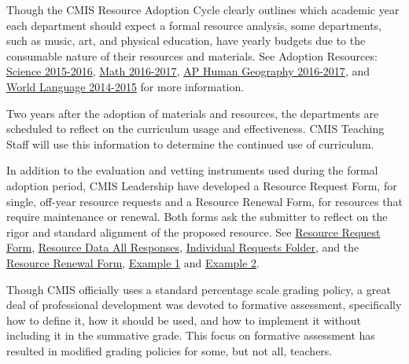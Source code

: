 \documentclass{report}
\begin{document}
\begin{findings}
Though the CMIS Resource Adoption Cycle clearly outlines which academic year each department should expect a formal resource analysis, some departments, such as music, art, and physical education, have yearly budgets due to the consumable nature of their resources and materials. See Adoption Resources: \href{https://drive.google.com/drive/folders/0ByVFfrm0zfoleXEyU3I0cTBXMVk?usp=sharing}{Science 2015-2016}, \href{https://drive.google.com/drive/folders/0ByVFfrm0zfolakRsUVNBaXhWcjQ?usp=sharing}{Math 2016-2017}, \href{https://drive.google.com/drive/folders/0ByVFfrm0zfolLUN5UThPTG5wQlE?usp=sharing}{AP Human Geography 2016-2017}, and \href{https://drive.google.com/drive/folders/0ByVFfrm0zfolfkhGeTFZSVRmSFNEZmhlaWZneEE5T0lwWjNQVnlFYVVWVlljU1RBTDZQc1k?usp=sharing}{World Language 2014-2015} for more information. 

Two years after the adoption of materials and resources, the departments are scheduled to reflect on the curriculum usage and effectiveness. CMIS Teaching Staff will use this information to determine the continued use of curriculum. 

In addition to the evaluation and vetting instruments used during the formal adoption period, CMIS Leadership have developed a Resource Request Form, for single, off-year resource requests and a Resource Renewal Form, for resources that require maintenance or renewal. Both forms ask the submitter to reflect on the rigor and standard alignment of the proposed resource. See \href{https://docs.google.com/a/cmis.ac.th/forms/d/1hBKsxgHpPSOT0MtUTsZBoVX2t3ztxeGVY4R4BVNeVL8/edit}{Resource Request Form}, \href{https://docs.google.com/a/cmis.ac.th/forms/d/1hBKsxgHpPSOT0MtUTsZBoVX2t3ztxeGVY4R4BVNeVL8/edit#responses}{Resource Data All Responses}, \href{https://drive.google.com/a/cmis.ac.th/folderview?id=0ByS3bptlVBHAejQ4NzU1N1N3czg&usp=sharing}{Individual Requests Folder}, and the \href{https://docs.google.com/a/cmis.ac.th/forms/d/1i6EnhitZ2yJZh-1OjL8jsJ2pFa7oRJCP0VcA50b_D6g/edit}{Resource Renewal Form}, \href{https://docs.google.com/a/cmis.ac.th/forms/d/1J9Q6VJRMvQKeRbV8gyk7xpHedNJdHU5Cw6Eozh6VEyA/viewanalytics}{Example 1} and \href{https://docs.google.com/a/cmis.ac.th/forms/d/1iTpwUI7XPqV5xIkZhTrpfsY5-K4vU8GkVbr0SKKZdJ8/viewanalytics}{Example 2}.


Though CMIS officially uses a standard percentage scale grading policy,  a great deal of professional development was devoted to formative assessment, specifically how to define it, how it should be used, and how to implement it without including it in the summative grade. This focus on formative assessment has resulted in modified grading policies for some, but not all, teachers. 


\end{findings}
\end{document}
